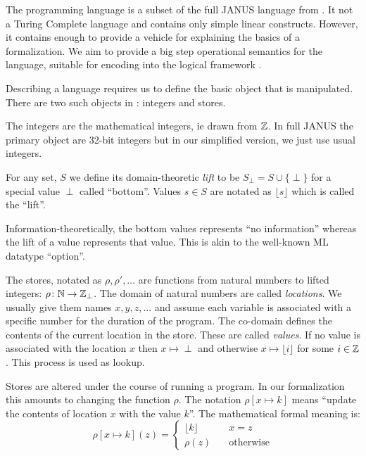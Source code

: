 The \janusz{} programming language is a subset of the full JANUS
language from \cite{glueck2007}. It not a Turing Complete language and
contains only simple linear constructs. However, it contains enough to
provide a vehicle for explaining the basics of a formalization. We aim
to provide a big step operational semantics for the language, suitable
for encoding into the logical framework \coq{}.

Describing a language requires us to define the basic object that is
manipulated. There are two such objects in \janusz{}: integers and
stores.

The integers are the mathematical integers, ie drawn from $\mathbb{Z}$. In
full JANUS the primary object are 32-bit integers but in our
simplified version, we just use usual integers.

\newcommand{\lift}[1]{\lfloor #1 \rfloor}
\begin{defn}
  \label{defn-lift}
  For any set, $S$ we define its domain-theoretic \emph{lift} to be
  $S_{\perp} = S \cup \{\perp\} $ for a special value $\perp$ called
  ``bottom''. Values $s \in S$ are notated as $\lift{s}$ which is
  called the ``lift''.
\end{defn}
Information-theoretically, the bottom values represents ``no
information'' whereas the lift of a value represents that value. This
is akin to the well-known ML datatype ``option''.

The stores, notated as $\rho, \rho', \dotsc$ are functions from
natural numbers to lifted integers: $\rho \colon \mathbb{N} \to
\mathbb{Z}_{\perp}$. The domain of natural numbers are called
\emph{locations}. We usually give them names $x, y, z, \dotsc$ and
assume each variable is associated with a specific number for the
duration of the program. The co-domain defines the contents of the
current location in the store. These are called \emph{values}. If no
value is associated with the location $x$ then $x \mapsto \perp$ and
otherwise $x \mapsto \lift{i}$ for some $i \in \mathbb{Z}$. This process is
used as lookup.

Stores are altered under the course of running a program. In our
formalization this amounts to changing the function
$\rho$. The notation $\rho[x \mapsto k]$ means ``update the contents
of location $x$ with the value $k$''. The mathematical formal meaning
is:
\begin{equation*}
  \rho[x \mapsto k](z) = \begin{cases}
    \lift{k} & \quad x = z\\
    \rho(z)  & \quad \text{otherwise}
  \end{cases}
\end{equation*}

